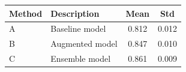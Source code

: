 \begin{table}[htbp]
\centering
\begin{tabularx}{\textwidth}{lXSS}
\toprule
Method & Description & {Mean} & {Std} \\
\midrule
A & Baseline model & 0.812 & 0.012 \\
B & Augmented model & 0.847 & 0.010 \\
C & Ensemble model & 0.861 & 0.009 \\
\bottomrule
\end{tabularx}
\end{table}
